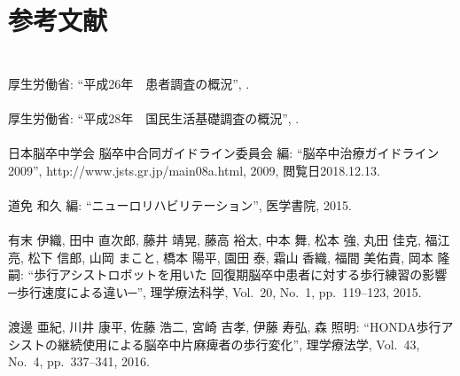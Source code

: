 \chapter*{参考文献}
\label{ref}
\lhead[参考文献]{}
\thispagestyle{empty}


\newpage
\subsection*{}

\begin{mythebibliography}{99}

\leavevmode \\
厚生労働省:
\newblock ``平成26年　患者調査の概況'',
.
\\

\leavevmode \\
厚生労働省:
\newblock ``平成28年　国民生活基礎調査の概況'',
.
\\

\leavevmode \\
日本脳卒中学会 脳卒中合同ガイドライン委員会 編:
\newblock ``脳卒中治療ガイドライン2009'',
\newblock http://www.jsts.gr.jp/main08a.html, 2009, 閲覧日2018.12.13.
\\

\leavevmode \\
道免 和久 編:
\newblock ``ニューロリハビリテーション'',
\newblock 医学書院, 2015.
\\

\leavevmode \\
有末 伊織, 田中 直次郎, 藤井 靖晃, 藤高 裕太, 中本 舞, 松本 強, 丸田 佳克, 福江 亮, 松下 信郎, 山岡 まこと, 橋本 陽平, 園田 泰, 霜山 香織, 福間 美佑貴, 岡本 隆嗣:
\newblock ``歩行アシストロボットを用いた 回復期脳卒中患者に対する歩行練習の影響 ─歩行速度による違い─'',
\newblock 理学療法科学, Vol.~20, No.~1, pp.~119--123, 2015.
\\

\leavevmode \\
渡邊 亜紀, 川井 康平, 佐藤 浩二, 宮崎 吉孝, 伊藤 寿弘, 森 照明:
\newblock ``HONDA歩行アシストの継続使用による脳卒中片麻痺者の歩行変化'',
\newblock 理学療法学, Vol.~43, No.~4, pp.~337--341, 2016.
\\


\end{mythebibliography}

